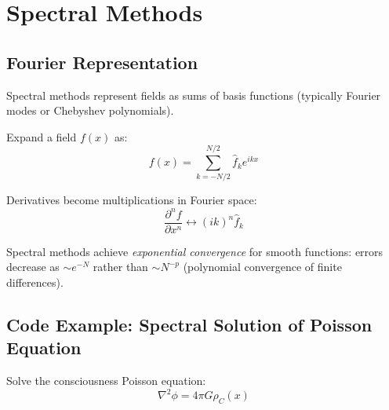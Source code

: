 \section{Spectral Methods}

\subsection{Fourier Representation}

Spectral methods represent fields as sums of basis functions (typically Fourier modes or Chebyshev polynomials).

\begin{definition}\label{def:fourier-spectral}
Expand a field $f(x)$ as:
\begin{equation}
f(x) = \sum_{k=-N/2}^{N/2} \hat{f}_k e^{ikx}
\end{equation}

Derivatives become multiplications in Fourier space:
\begin{equation}
\frac{\partial^n f}{\partial x^n} \leftrightarrow (ik)^n \hat{f}_k
\end{equation}
\end{definition}

Spectral methods achieve \textit{exponential convergence} for smooth functions: errors decrease as $\sim e^{-N}$ rather than $\sim N^{-p}$ (polynomial convergence of finite differences).

\subsection{Code Example: Spectral Solution of Poisson Equation}

Solve the consciousness Poisson equation:
\begin{equation}
\nabla^2 \phi = 4\pi G \rho_C(x)
\end{equation}

